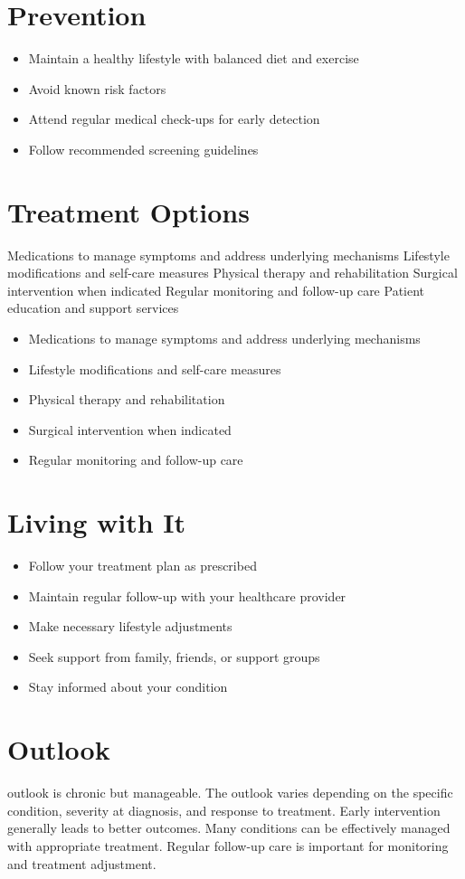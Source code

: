 \section{Prevention}
\begin{itemize}[noitemsep]
  \item Maintain a healthy lifestyle with balanced diet and exercise
  \item Avoid known risk factors
  \item Attend regular medical check-ups for early detection
  \item Follow recommended screening guidelines
\end{itemize}
\section{Treatment Options}
Medications to manage symptoms and address underlying mechanisms Lifestyle modifications and self-care measures Physical therapy and rehabilitation Surgical intervention when indicated Regular monitoring and follow-up care Patient education and support services

\begin{itemize}[noitemsep]
  \item Medications to manage symptoms and address underlying mechanisms
  \item Lifestyle modifications and self-care measures
  \item Physical therapy and rehabilitation
  \item Surgical intervention when indicated
  \item Regular monitoring and follow-up care
\end{itemize}
\section{Living with It}
\begin{itemize}[noitemsep]
  \item Follow your treatment plan as prescribed
  \item Maintain regular follow-up with your healthcare provider
  \item Make necessary lifestyle adjustments
  \item Seek support from family, friends, or support groups
  \item Stay informed about your condition
\end{itemize}
\section{Outlook}
outlook is chronic but manageable. The outlook varies depending on the specific condition, severity at diagnosis, and response to treatment. Early intervention generally leads to better outcomes. Many conditions can be effectively managed with appropriate treatment. Regular follow-up care is important for monitoring and treatment adjustment.
